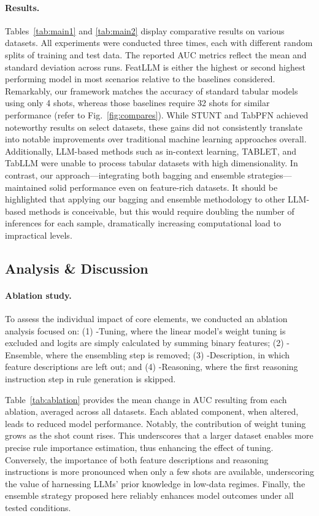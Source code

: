 \vspace*{-0.12in}
\paragraph{Results.}
Tables~\ref{tab:main1} and \ref{tab:main2} display comparative results on various datasets. All experiments were conducted three times, each with different random splits of training and test data. The reported AUC metrics reflect the mean and standard deviation across runs. \textsf{FeatLLM} is either the highest or second highest performing model in most scenarios relative to the baselines considered. Remarkably, our framework matches the accuracy of standard tabular models using only 4 shots, whereas those baselines require 32 shots for similar performance (refer to Fig.~\ref{fig:compares}). While STUNT and TabPFN achieved noteworthy results on select datasets, these gains did not consistently translate into notable improvements over traditional machine learning approaches overall. Additionally, LLM-based methods such as in-context learning, TABLET, and TabLLM were unable to process tabular datasets with high dimensionality. In contrast, our approach—integrating both bagging and ensemble strategies—maintained solid performance even on feature-rich datasets. It should be highlighted that applying our bagging and ensemble methodology to other LLM-based methods is conceivable, but this would require doubling the number of inferences for each sample, dramatically increasing computational load to impractical levels.

\subsection{Analysis \& Discussion}
\label{sec:analysis}
\paragraph{Ablation study.} To assess the individual impact of core elements, we conducted an ablation analysis focused on: (1) \textsf{-Tuning}, where the linear model's weight tuning is excluded and logits are simply calculated by summing binary features; (2) \textsf{-Ensemble}, where the ensembling step is removed; (3) \textsf{-Description}, in which feature descriptions are left out; and (4) \textsf{-Reasoning}, where the first reasoning instruction step in rule generation is skipped.

Table~\ref{tab:ablation} provides the mean change in AUC resulting from each ablation, averaged across all datasets. Each ablated component, when altered, leads to reduced model performance. Notably, the contribution of weight tuning grows as the shot count rises. This underscores that a larger dataset enables more precise rule importance estimation, thus enhancing the effect of tuning. Conversely, the importance of both feature descriptions and reasoning instructions is more pronounced when only a few shots are available, underscoring the value of harnessing LLMs’ prior knowledge in low-data regimes. Finally, the ensemble strategy proposed here reliably enhances model outcomes under all tested conditions.

